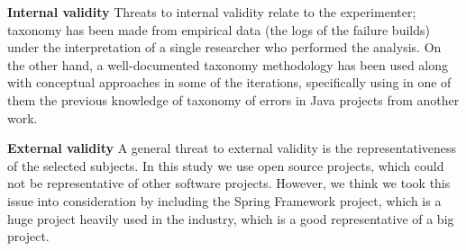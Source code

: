 

\textbf{Internal validity} Threats to internal validity relate to the experimenter; taxonomy has been made from empirical data (the logs of the failure builds) under the interpretation of a single researcher who performed the analysis. On the other hand, a well-documented taxonomy methodology has been used along with conceptual approaches in some of the iterations, specifically using in one of them the previous knowledge of taxonomy of errors in Java projects from another work.



\textbf{External validity} A general threat to external validity is the representativeness of the selected subjects. In this study we use open source projects, which could not be representative of other software projects. However, we think we took this issue into consideration by including the Spring Framework project, which is a huge project heavily used in the industry, which is a good representative of a big project. 









